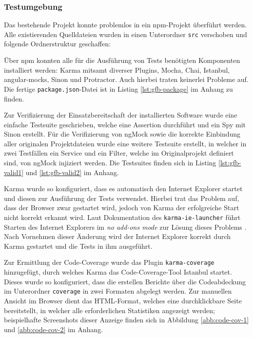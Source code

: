 \newpage
\subsubsection{Testumgebung}
Das bestehende Projekt konnte problemlos in ein npm-Projekt überführt werden. Alle existierenden Quelldateien wurden in einen Unterordner \texttt{src} verschoben und folgende Ordnerstruktur geschaffen:
\begin{figure}[H]
\end{figure}

Über npm konnten alle für die Ausführung von Tests benötigten Komponenten installiert werden: Karma mitsamt diverser Plugins, Mocha, Chai, Istanbul, angular-mocks, Sinon und Protractor. Auch hierbei traten keinerlei Probleme auf. Die fertige \texttt{package.json}-Datei ist in Listing \ref{lst:gfb-package} im Anhang zu finden.

Zur Verifizierung der Einsatzbereitschaft der installierten Software wurde eine einfache Testsuite geschrieben, welche eine Assertion durchführt und ein Spy mit Sinon erstellt. Für die Verifizierung von ngMock sowie die korrekte Einbindung aller originalen Projektdateien wurde eine weitere Testsuite erstellt, in welcher in zwei Testfällen ein Service und ein Filter, welche im Originalprojekt definiert sind, von ngMock injiziert werden. Die Testsuites finden sich in Listing \ref{lst:gfb-valid1} und \ref{lst:gfb-valid2} im Anhang. 

Karma wurde so konfiguriert, dass es automatisch den Internet Explorer startet und diesen zur Ausführung der Tests verwendet. Hierbei trat das Problem auf, dass der Browser zwar gestartet wird, jedoch von Karma der erfolgreiche Start nicht korrekt erkannt wird. Laut Dokumentation des \texttt{karma-ie-launcher} führt Starten des Internet Explorers im \textit{no add-ons mode} zur Lösung dieses Problems \cite{karma-ie-launcher}. Nach Vornehmen dieser Änderung wird der Internet Explorer korrekt durch Karma gestartet und die Tests in ihm ausgeführt.

Zur Ermittlung der Code-Coverage wurde das Plugin \texttt{karma-coverage} hinzugefügt, durch welches Karma das Code-Coverage-Tool Istanbul startet. Dieses wurde so konfiguriert, dass die erstellen Berichte über die Codeabdeckung im Unterordner \texttt{coverage} in zwei Formaten abgelegt werden. Zur manuellen Ansicht im Browser dient das HTML-Format, welches eine durchklickbare Seite bereitstellt, in welcher alle erforderlichen Statistiken angezeigt werden; beispielhafte Screenshots dieser Anzeige finden sich in Abbildung \ref{abb:code-cov-1} und \ref{abb:code-cov-2} im Anhang. 

